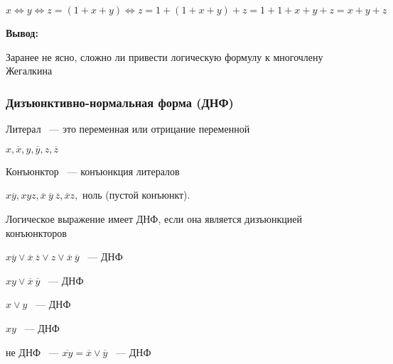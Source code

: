 \documentclass[russian]{lecture-notes}
\begin{document}
\begin{sloppypar}
	$x \Leftrightarrow y \Leftrightarrow z = (1 + x + y) \Leftrightarrow z = 1 + (1 + x + y) + z  = 1 + 1 + x + y + z = x + y + z $
	
\textbf{Вывод:}

	Заранее не ясно, сложно ли привести логическую формулу к многочлену Жегалкина	

\subsubsection{Дизъюнктивно-нормальная форма (ДНФ)}

\begin{definition} 
	Литерал ~--- это переменная или отрицание переменной
\end{definition}

\begin{example}
	$x, \overline{x}, y, \overline{y}, z, \overline{z}$
\end{example}

\begin{definition} 
	Конъюнктор ~--- конъюнкция литералов
\end{definition}

\begin{example}
	$x\overline{y}, xyz, \overline{x} \: \overline{y} \: \overline{z}, \overline{x}z,$ ноль (пустой конъюнкт).
\end{example}

\begin{definition} 
	Логическое выражение имеет ДНФ, если она является дизъюнкцией конъюнкторов
\end{definition}

\begin{example}
	$x\overline{y} \lor \overline{x} \: \overline{z} \lor z \lor \overline{x} \: \overline{y}$ ~--- ДНФ
\end{example}

\begin{example}
	$xy \lor \overline{x} \: \overline{y}$ ~--- ДНФ
\end{example}

\begin{example}
	$x \lor y$ ~--- ДНФ
\end{example}

\begin{example}
	$xy$ ~--- ДНФ
\end{example}

\begin{example}
	не ДНФ ~--- $\overline{xy} = \overline{x} \lor \overline{y}$ ~---  ДНФ
\end{example}


\end{sloppypar}
\end{document}
